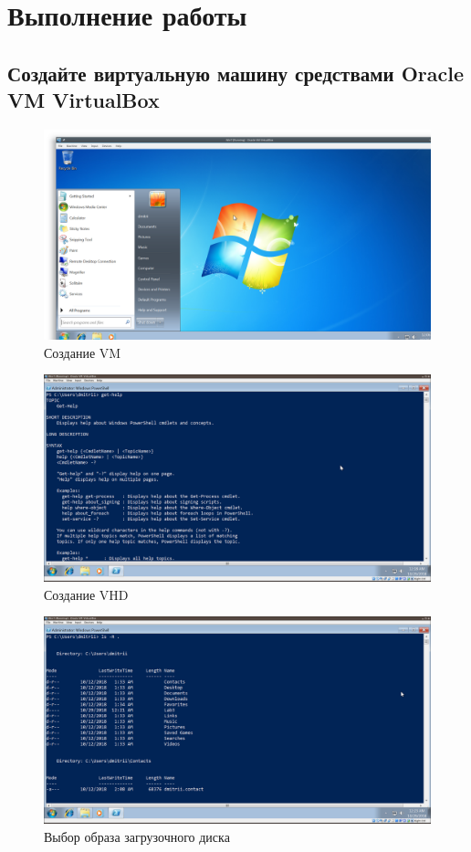 \documentclass[a4paper]{article}
\begin{document}
\section{Выполнение работы}

\subsection{Создайте виртуальную машину средствами Oracle VM VirtualBox}

\begin{figure}[H]
    \centering
    \includegraphics[width=\linewidth]{1.png}
    \caption{Создание VM}
\end{figure}

\begin{figure}[H]
    \centering
    \includegraphics[width=\linewidth]{2.png}
    \caption{Создание VHD}
\end{figure}

\begin{figure}[H]
    \centering
    \includegraphics[width=\linewidth]{4.png}
    \caption{Выбор образа загрузочного диска}
\end{figure}
\end{document}
